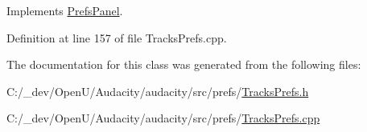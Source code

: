 Implements \hyperlink{class_prefs_panel_ab5572aedab201c47fbbdf714c6a2b781}{Prefs\+Panel}.



Definition at line 157 of file Tracks\+Prefs.\+cpp.



The documentation for this class was generated from the following files\+:\begin{DoxyCompactItemize}
\item 
C\+:/\+\_\+dev/\+Open\+U/\+Audacity/audacity/src/prefs/\hyperlink{_tracks_prefs_8h}{Tracks\+Prefs.\+h}\item 
C\+:/\+\_\+dev/\+Open\+U/\+Audacity/audacity/src/prefs/\hyperlink{_tracks_prefs_8cpp}{Tracks\+Prefs.\+cpp}\end{DoxyCompactItemize}
